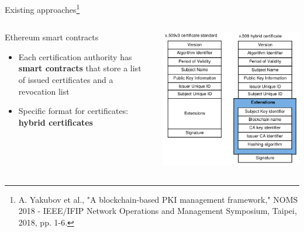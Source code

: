 \begin{frame}{Existing approaches\footnote{A. Yakubov et al., "A blockchain-based PKI management framework," NOMS 2018 - IEEE/IFIP Network Operations and Management Symposium, Taipei, 2018, pp. 1-6.}}
\begin{columns}
\begin{column}{0.48\textwidth}
	\begin{exampleblock}{Ethereum smart contracts}
		\begin{itemize}
			\item Each certification authority has \textbf{smart contracts} that store a list of issued certificates and a revocation list
			\item Specific format for certificates: \textbf{hybrid certificates}
		\end{itemize}
	\end{exampleblock}
\end{column}
\begin{column}{0.48\textwidth}
	\begin{center}
		\includegraphics[scale=0.2]{figs/article_pki_blockchain.png}
	\end{center}
\end{column}
\end{columns}
\end{frame}


